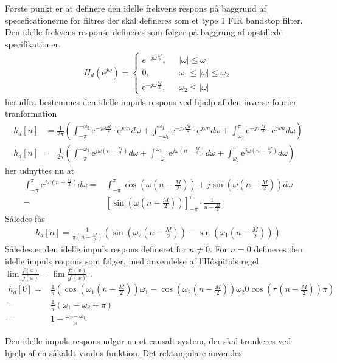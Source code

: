 Første punkt er at definere den idelle frekvens respons på baggrund af speceficationerne for filtres der skal defineres som et type 1 FIR bandstop filter. \\
Den idelle frekvens response defineres som følger på baggrung af opstillede specifikationer.
\begin{align}
 H_d(\text{e}^{j\omega})= \begin{cases}
  {e}^{-j\omega\frac{M}{2}}, \ \ \ & |\omega| \leq\omega_1 \\
 0, \ \ \ & \omega_1 \leq |\omega| \leq \omega_2 \\
  \text{e}^{-j\omega\frac{M}{2}}, \ \ \ & \omega_2 \leq |\omega| 
\end{cases}
\end{align}  
herudfra bestemmes den idelle impuls respons ved hjælp af den inverse fourier tranformation 
\begin{align}
h_d[n] &= \frac{1}{2\pi} \left(  \int_{-\pi}^{-\omega_2} \text{e}^{-j\omega \frac{M}{2}} \cdot \text{e}^{j \omega n} d\omega + \int_{-\omega_1}^{\omega_1} \text{e}^{-j\omega \frac{M}{2}} \cdot \text{e}^{j \omega n} d\omega +\int_{\omega_2}^{\pi} \text{e}^{-j\omega \frac{M}{2}} \cdot \text{e}^{j \omega n} d\omega	\right) \\
h_d[n] &= \frac{1}{2\pi} \left(  \int_{-\pi}^{-\omega_2} \text{e}^{j\omega \left(n- \frac{M}{2} \right) } d\omega + \int_{-\omega_1}^{\omega_1} \text{e}^{j\omega \left(n- \frac{M}{2} \right) }  d\omega +\int_{\omega_2}^{\pi} \text{e}^{j\omega \left( n-\frac{M}{2} \right) } d\omega	\right)
\end{align} 
her udnyttes nu at
\begin{align}
\int_{-\pi}^{\pi} \text{e}^{j\omega \left(n- \frac{M}{2} \right) }  d\omega =& \int_{-\pi}^{\pi} \cos\left( \omega \left(n-\frac{M}{2}\right)\right)+j \sin \left( \omega \left(n-\frac{M}{2}\right) \right) d\omega \\
=& \left[ \sin\left(\omega \left(n-\frac{M}{2}\right)\right) \right]_{-\pi}^{\pi} \cdot \frac{1}{n- \frac{M}{2}}
\end{align}    
Således fås 
\begin{align}
h_d[n]= \frac{1}{\pi \left(n-\frac{M}{2}\right)} \left(\sin\left(\omega_2 \left(n-\frac{M}{2}\right)\right) - \sin\left(\omega_1 \left(n-\frac{M}{2}\right)\right) \right)
\end{align}
Således er den idelle impuls respons defineret for $n \neq 0$. For $n=0$ defineres den idelle impuls respons som følger, med anvendelse af l'Hôspitals regel $\lim \frac{f(x)}{g(x)}=\lim \frac{f'(x)}{g'(x)}$ .
\begin{align}
h_d[0]=& \frac{1}{\pi} \left( \cos\left( \omega_1\left(n-\frac{M}{2}\right) \right)\omega_1 - \cos\left( \omega_2\left(n-\frac{M}{2}\right) \right)\omega_2 0 \cos\left(\pi \left( n- \frac{M}{2}\right) \right) \pi \right) \\
=& \frac{1}{\pi}\left( \omega_1 - \omega_2 + \pi \right) \\
=& 1 - \frac{\omega_2-\omega_1}{\pi}
\end{align} 

Den idelle impuls respons udgør nu et causalt system, der skal trunkeres ved hjælp af en såkaldt vindus funktion. Det rektangulare anvendes   
 